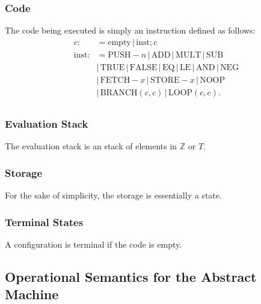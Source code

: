 \documentclass[a4paper, 12pt, twoside]{article}
\begin{document}
\subsubsection{Code}

The code being executed is simply an instruction defined as follows:
\begin{align*}
  c :&= \text{empty} \, | \, \text{inst};c \\
  \text{inst} :&= \text{PUSH}-n \, | \, \text{ADD} \, | \, \text{MULT} \, | \, \text{SUB} \\
  &| \, \text{TRUE} \, | \, \text{FALSE} \, | \, \text{EQ} \, | \, \text{LE} \, | \, \text{AND} \, | \, \text{NEG} \\
  &| \, \text{FETCH}-x \, | \, \text{STORE}-x \, | \, \text{NOOP} \\
  &| \, \text{BRANCH}(c, c) \, | \, \text{LOOP}(c, c). \\
\end{align*}

\subsubsection{Evaluation Stack}

The evaluation stack is an stack of elements in $\mathbb{Z}$ or $T$.

\subsubsection{Storage}

For the sake of simplicity, the storage is essentially a state.

\subsubsection{Terminal States}

A configuration is terminal if the code is empty.

\newpage

\subsection{Operational Semantics for the Abstract Machine}
\end{document}

